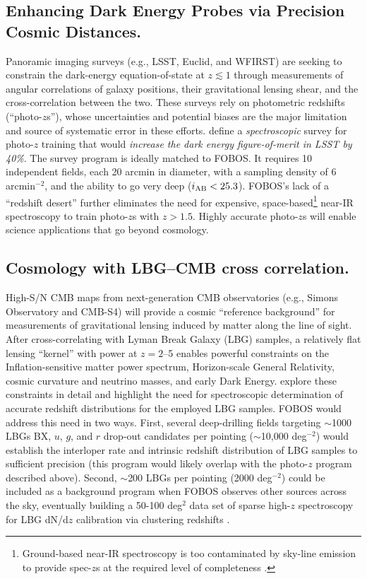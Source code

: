 
\subsection{Enhancing Dark Energy Probes via Precision Cosmic Distances.}
\label{sec:cosmology}

Panoramic imaging surveys (e.g., LSST, Euclid, and WFIRST) are seeking to constrain the dark-energy
equation-of-state at $z \lesssim 1$ through measurements of angular correlations of galaxy positions, their
gravitational lensing shear, and the cross-correlation between the two.  These surveys rely on photometric redshifts
(``photo-$z$s''), whose uncertainties and potential biases are the major limitation and source of systematic error in
these efforts.  \citet{newman15} define a \emph{spectroscopic} survey for photo-$z$ training that would \emph{increase
the dark energy figure-of-merit in LSST by 40\%}.  The survey program is ideally matched to FOBOS.  It requires 10
independent fields, each 20 arcmin in diameter, with a sampling density of 6 arcmin$^{-2}$, and the ability to go very
deep ($i_{\rm AB} < 25.3$).  FOBOS's lack of a ``redshift desert'' further eliminates the need for expensive, space-based\footnote{Ground-based near-IR spectroscopy is too contaminated by
sky-line emission to provide spec-$z$s at the required level of completeness \citep{newman15}.} near-IR spectroscopy to train photo-$z$s with $z > 1.5$.  Highly accurate photo-$z$s will enable science applications that go beyond cosmology.

\subsection{Cosmology with LBG--CMB cross correlation.}
\label{sec:LBG}

High-S/N CMB maps from next-generation CMB observatories (e.g., Simons Observatory and CMB-S4) will provide a cosmic
``reference background'' for measurements of gravitational lensing induced by matter along the line of sight.  After
cross-correlating with Lyman Break Galaxy (LBG) samples, a relatively flat lensing ``kernel'' with power at $z = 2$--5
enables powerful constraints on the Inflation-sensitive matter power spectrum, Horizon-scale General Relativity, cosmic
curvature and neutrino masses, and early Dark Energy.  \citet{wilson19} explore these constraints in detail and
highlight the need for spectroscopic determination of accurate redshift distributions for the employed LBG samples.
FOBOS would address this need in two ways.  First, several deep-drilling fields targeting $\sim$1000 LBGs BX, $u$, $g$,
and $r$ drop-out candidates per pointing ($\sim$10,000 deg$^{-2}$) would establish the interloper rate and intrinsic
redshift distribution of LBG samples to sufficient precision (this program would likely overlap with the photo-$z$
program described above).  Second, $\sim$200 LBGs per pointing (2000 deg$^{-2}$) could be included as a background
program when FOBOS observes other sources across the sky, eventually building a 50-100 deg$^2$ data set of sparse
high-$z$ spectroscopy for LBG dN/d$z$ calibration via clustering redshifts \citep[see][]{wilson19}.


